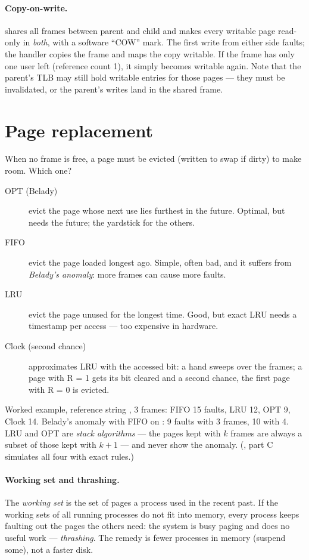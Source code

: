 \paragraph{Copy-on-write.}  shares all frames between parent
and child and makes every writable page read-only in \emph{both}, with a
software ``COW'' mark. The first write from either side faults; the
handler copies the frame and maps the copy writable. If the frame has only
one user left (reference count 1), it simply becomes writable again. Note
that the parent's TLB may still hold writable entries for those pages ---
they must be invalidated, or the parent's writes land in the shared frame.

\section{Page replacement}

When no frame is free, a page must be evicted (written to swap if dirty)
to make room. Which one?

\begin{description}
  \item[OPT (Belady)] evict the page whose next use lies furthest in the
    future. Optimal, but needs the future; the yardstick for the others.
  \item[FIFO] evict the page loaded longest ago. Simple, often bad, and it
    suffers from \emph{Belady's anomaly}: more frames can cause more
    faults.
  \item[LRU] evict the page unused for the longest time. Good, but exact
    LRU needs a timestamp per access --- too expensive in hardware.
  \item[Clock (second chance)] approximates LRU with the accessed bit: a
    hand sweeps over the frames; a page with R = 1 gets its bit cleared
    and a second chance, the first page with R = 0 is evicted.
\end{description}

Worked example, reference string , 3 frames: FIFO 15 faults, LRU 12, OPT 9, Clock 14. Belady's anomaly
with FIFO on : 9 faults with 3 frames, 10
with 4. LRU and OPT are \emph{stack algorithms} --- the pages kept with $k$
frames are always a subset of those kept with $k+1$ --- and never show the
anomaly. (, part C simulates all four with exact rules.)

\paragraph{Working set and thrashing.} The \emph{working set} is the set
of pages a process used in the recent past. If the working sets of all
running processes do not fit into memory, every process keeps faulting
out the pages the others need: the system is busy paging and does no
useful work --- \emph{thrashing}. The remedy is fewer processes in memory
(suspend some), not a faster disk.

